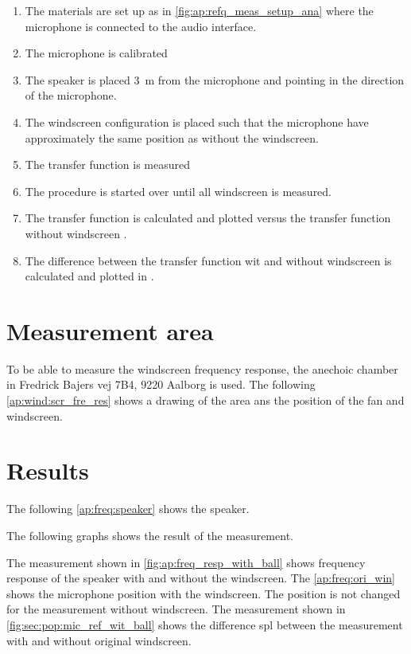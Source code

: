 \begin{enumerate}
\item The materials are set up as in \autoref{fig:ap:refq_meas_setup_ana} where the  microphone is connected to the audio interface.
\item The microphone is calibrated
\item The speaker is placed \SI{3}{\meter} from the microphone and pointing in the direction of the microphone.
\item	The windscreen configuration is placed such that the microphone have approximately the same position as without the windscreen.
\item The transfer function is measured 
\item The procedure is started over until all windscreen is measured.
\item The transfer function is calculated and plotted versus the transfer function without windscreen \matlab.
\item The difference between the transfer function wit and without windscreen is calculated and plotted in \matlab.
\end{enumerate}


\section*{Measurement area}
To be able to measure the windscreen frequency response, the anechoic chamber in Fredrick Bajers vej 7B4, 9220 Aalborg is used. The following \autoref{ap:wind:scr_fre_res} shows a drawing of the area ans the position of the fan and windscreen.


\section*{Results}

The following \autoref{ap:freq:speaker} shows the speaker.


The following graphs shows the result of the measurement. 

The measurement shown in \autoref{fig:ap:freq_resp_with_ball} shows frequency response of the speaker with and without the windscreen. The \autoref{ap:freq:ori_win} shows the microphone position with the windscreen. The position is not changed for the measurement without windscreen. 
The measurement shown in \autoref{fig:sec:pop:mic_ref_wit_ball} shows the difference \gls{spl} between the measurement with and without original windscreen. 

